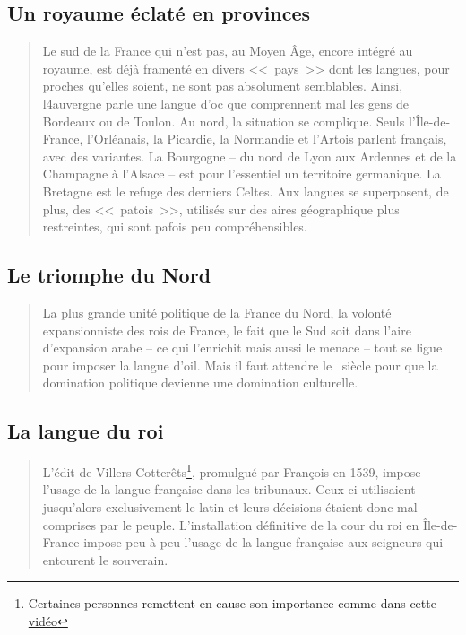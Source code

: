 \subsection{Un royaume éclaté en provinces}\label{subsec:roysplit}

\begin{quotation}
  Le sud de la France qui n'est pas, au Moyen Âge, encore intégré au
  royaume, est déjà framenté en divers <<~pays~>> dont les langues,
  pour proches qu'elles soient, ne sont pas absolument semblables.
  Ainsi, l4auvergne parle une langue d'oc que comprennent mal les gens
  de Bordeaux ou de Toulon.
  Au nord, la situation se complique. Seuls l'Île-de-France,
  l'Orléanais, la Picardie, la Normandie et l'Artois parlent français,
  avec des variantes.
  La Bourgogne -- du nord de Lyon aux Ardennes et de la Champagne à
  l'Alsace -- est pour l'essentiel un territoire germanique.
  La Bretagne est le refuge des derniers Celtes.
  Aux langues se superposent, de plus, des <<~patois~>>, utilisés sur
  des aires géographique plus restreintes, qui sont pafois peu compréhensibles.
\end{quotation}

\subsection{Le triomphe du Nord}\label{subsec:trinord}

\begin{quote}
  La plus grande unité politique de la France du Nord, la volonté
  expansionniste des rois de France, le fait que le Sud soit dans
  l'aire d'expansion arabe -- ce qui l'enrichit mais aussi le menace
  -- tout se ligue pour imposer la langue d'oil.
  Mais il faut attendre le \textsc{}~siècle pour
  que la domination politique devienne une domination culturelle.
\end{quote}

\subsection{La langue du roi}\label{subsec:langroy}
\begin{quotation}
  L'édit de Villers-Cotterêts\footnote{Certaines personnes remettent
    en cause son importance comme dans cette \href{https://youtu.be/x3TQkQO_XMc}{vidéo}}, promulgué par François
  {\scshape{}} en 1539, impose l'usage de la langue
  française dans les tribunaux. Ceux-ci utilisaient jusqu'alors
  exclusivement le latin et leurs décisions étaient donc mal comprises
  par le peuple.
  L'installation définitive de la cour du roi en Île-de-France impose
  peu à peu l'usage de la langue française aux seigneurs qui entourent
  le souverain.
\end{quotation}

